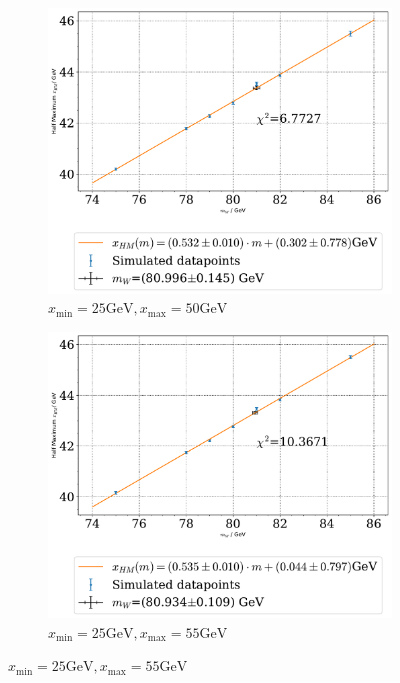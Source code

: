 \documentclass[11pt,a4paper,notitlepage]{scrartcl}
\begin{document}
\begin{figure}[H]
	\begin{subfigure}{0.49\linewidth}
		\includegraphics[width=\linewidth]{P1_pics/gauge_results/gauge_xmin_25_xmax_50.pdf}
		\caption{$x_\text{min}=25 \text{GeV}, x_\text{max}=50\text{GeV}$}
	\end{subfigure}
	\begin{subfigure}{0.49\linewidth}
		\includegraphics[width=\linewidth]{P1_pics/gauge_results/gauge_xmin_25_xmax_55.pdf}
		\caption{$x_\text{min}=25\text{GeV}, x_\text{max}=55\text{GeV}$}
	\end{subfigure}

\end{figure}
\end{document}
